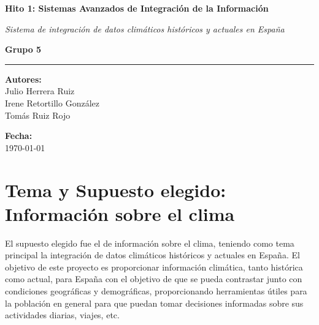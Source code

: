 \documentclass[12pt, a4paper]{article}
\begin{document}
\begin{titlepage}
    \centering
    \vspace*{2cm}
    
    {\Huge \textbf{Hito 1: Sistemas Avanzados de Integración de la Información}\par}
    
    \vspace{1cm} %
    
    {\LARGE \textit{Sistema de integración de datos climáticos históricos y actuales en España}\par}
    
    \vfill    
    \vfill
    
    {\Large \textbf{Grupo 5}} \\
    \vspace{0.2cm}
    \rule{0.3\linewidth}{0.5pt} %
    \vspace{0.5cm}
    
    \textbf{Autores:}\\
    {\large
    Julio Herrera Ruiz \\
    Irene Retortillo González \\
    Tomás Ruiz Rojo \\
    }
    
    \vspace{1cm}
    
    \textbf{Fecha:}\\
    {\large \today}
    
    \vfill
\end{titlepage}
\tableofcontents
\newpage

\section{Tema y Supuesto elegido: Información sobre el clima}
El supuesto elegido fue el de información sobre el clima, teniendo como tema principal la integración de datos climáticos históricos y actuales en España.
El objetivo de este proyecto es proporcionar información climática, tanto histórica como actual, para España con el objetivo de que se pueda contrastar junto con condiciones geográficas y demográficas,
proporcionando herramientas útiles para la población en general para que puedan tomar decisiones informadas sobre sus actividades diarias, viajes, etc.
\end{document}
